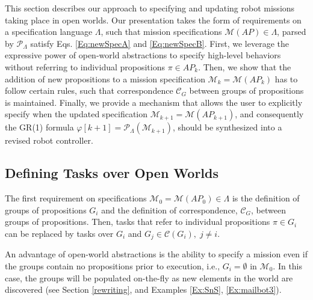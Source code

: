 This section describes our approach to specifying and updating robot missions taking place in open worlds. 
Our presentation takes the form of requirements on a specification language $\Lambda$, such that mission specifications $\mathcal{M}(AP) \in \Lambda$, parsed by $\mathcal{P}_{\Lambda}$ satisfy Eqs. \eqref{Eq:newSpecA} and \eqref{Eq:newSpecB}. 
First, we leverage the expressive power of open-world abstractions to specify high-level behaviors without referring to individual propositions $\pi \in AP_k$. 
Then, we show that the addition of new propositions to a mission specification $\mathcal{M}_k = \mathcal{M}(AP_k)$ has to follow certain rules, such that correspondence $\mathcal{C}_G$ between groups of propositions is maintained.
Finally, we provide a mechanism that allows the user to explicitly specify when the updated specification $\mathcal{M}_{k+1} = \mathcal{M}(AP_{k+1})$, and consequently the GR(1) formula 
$\varphi [k+1] = \mathcal{P}_{\Lambda} (\mathcal{M}_{k+1})$,
should be synthesized into a revised robot controller.

\subsection{Defining Tasks over Open Worlds}

The first requirement on specifications $\mathcal{M}_0 = \mathcal{M}(AP_0) \in \Lambda$ is the definition of groups of propositions $G_i$ and the definition of correspondence, $\mathcal{C}_G$, between groups of propositions. Then, tasks that refer to individual propositions $\pi \in G_i$ can be replaced by tasks over $G_i$ and $G_j \in \mathcal{C}(G_i), \; j \not = i$.

An advantage of open-world abstractions is the ability to specify a mission even if the groups contain no propositions prior to execution, i.e., $G_i = \emptyset$ in $\mathcal{M}_0$. In this case, the groups will be populated on-the-fly as new elements in the world are discovered (see Section \ref{rewriting}, and Examples \ref{Ex:SnS}, \ref{Ex:mailbot3}).

